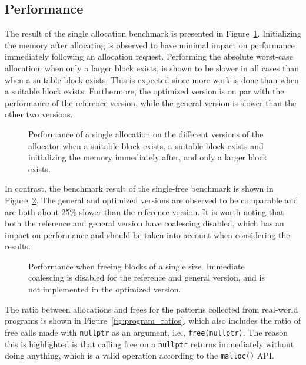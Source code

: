 
\subsection{Performance}
\label{sec:results:performance}

The result of the single allocation benchmark is presented in Figure~\ref{fig:allocation_performance}. Initializing the memory after allocating is observed to have minimal impact on performance immediately following an allocation request. Performing the absolute worst-case allocation, when only a larger block exists, is shown to be slower in all cases than when a suitable block exists. This is expected since more work is done than when a suitable block exists. Furthermore, the optimized version is on par with the performance of the reference version, while the general version is slower than the other two versions. 
\begin{figure}[h]
    \centering
    
    \caption{Performance of a single allocation on the different versions of the allocator when a suitable block exists, a suitable block exists and initializing the memory immediately after, and only a larger block exists.}
    \label{fig:allocation_performance}
\end{figure}

In contrast, the benchmark result of the single-free benchmark is shown in Figure~\ref{fig:free_performance}. The general and optimized versions are observed to be comparable and are both about 25\% slower than the reference version. It is worth noting that both the reference and general version have coalescing disabled, which has an impact on performance and should be taken into account when considering the results.

\begin{figure}[h]
    \centering
    
    \caption{Performance when freeing blocks of a single size. Immediate coalescing is disabled for the reference and general version, and is not implemented in the optimized version.}
    \label{fig:free_performance}
\end{figure}

The ratio between allocations and frees for the patterns collected from real-world programs is shown in Figure~\ref{fig:program_ratios}, which also includes the ratio of free calls made with \texttt{nullptr} as an argument, i.e., \texttt{free(nullptr)}. The reason this is highlighted is that calling free on a \texttt{nullptr} returns immediately without doing anything, which is a valid operation according to the \texttt{malloc()} API.

